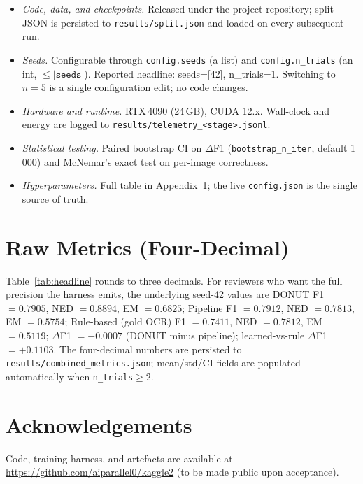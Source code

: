 \documentclass[conference]{IEEEtran}
\begin{document}
\begin{itemize}
  \item \emph{Code, data, and checkpoints.}  Released under the
        project repository; split JSON is persisted to
        \texttt{results/split.json} and loaded on every subsequent run.
  \item \emph{Seeds.}  Configurable through \texttt{config.seeds} (a
        list) and \texttt{config.n\_trials} (an int,
        $\le|\texttt{seeds}|$).  Reported headline: seeds=[42],
        n\_trials=1.  Switching to $n{=}5$ is a single
        configuration edit; no code changes.
  \item \emph{Hardware and runtime.}  RTX\,4090 (24\,GB), CUDA 12.x.
        Wall-clock and energy are logged to
        \texttt{results/telemetry\_\textless stage\textgreater.jsonl}.
  \item \emph{Statistical testing.}  Paired bootstrap CI on
        $\Delta$F1 (\texttt{bootstrap\_n\_iter}, default 1\,000)
        and McNemar's exact test on per-image correctness.
  \item \emph{Hyperparameters.}  Full table in
        Appendix~\ref{app:raw}; the live \texttt{config.json} is
        the single source of truth.
\end{itemize}


\section{Raw Metrics (Four-Decimal)}
\label{app:raw}

Table~\ref{tab:headline} rounds to three decimals.  For reviewers who
want the full precision the harness emits, the underlying seed-42
values are
DONUT F1 $=0.7905$, NED $=0.8894$, EM $=0.6825$;
Pipeline F1 $=0.7912$, NED $=0.7813$, EM $=0.5754$;
Rule-based (gold OCR) F1 $=0.7411$, NED $=0.7812$, EM $=0.5119$;
$\Delta$F1 $= -0.0007$ (DONUT minus pipeline);
learned-vs-rule $\Delta$F1 $= +0.1103$.
The four-decimal numbers are persisted to
\texttt{results/combined\_metrics.json}; mean/std/CI fields are
populated automatically when \texttt{n\_trials}$\ge 2$.

\section*{Acknowledgements}

Code, training harness, and artefacts are available at
\url{https://github.com/aiparallel0/kaggle2} (to be made public upon
acceptance).



\end{document}
